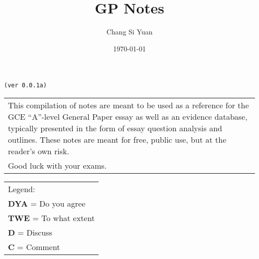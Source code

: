 \documentclass[../main]{subfiles}
\begin{document}
\author{Chang Si Yuan}
\title{GP Notes}
\date{\today}

\maketitle

\begin{center}

	\texttt{(ver 0.0.1a)}

	\vspace{50pt}

	\begin{tabular}{>{\flushleft}p{8cm}}
	This compilation of notes are meant to be used as a reference for the GCE ``A''-level General Paper essay as well as an evidence database, typically presented in the form of essay question analysis and outlines. These notes are meant for free, public use, but at the reader's own risk. \\
	Good luck with your exams.
	\end{tabular}

	\vspace{50pt}

	\begin{tabular}{>{\flushleft}p{8cm}}
	Legend: \\
	\textbf{DYA} = Do you agree \\
	\textbf{TWE} = To what extent \\
	\textbf{D} = Discuss \\
	\textbf{C} = Comment \\
	\end{tabular}

\end{center}

\newpage
\end{document}
